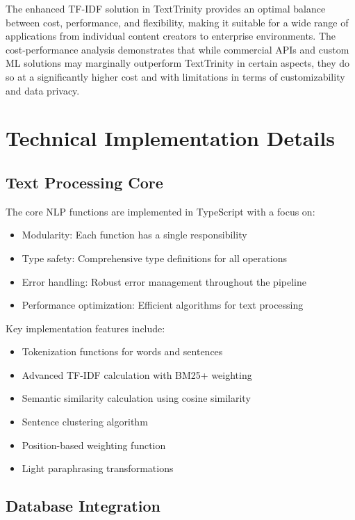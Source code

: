 \documentclass[12pt,a4paper]{article}
\begin{document}
The enhanced TF-IDF solution in TextTrinity provides an optimal balance between cost, performance, and flexibility, making it suitable for a wide range of applications from individual content creators to enterprise environments. The cost-performance analysis demonstrates that while commercial APIs and custom ML solutions may marginally outperform TextTrinity in certain aspects, they do so at a significantly higher cost and with limitations in terms of customizability and data privacy.

\section{Technical Implementation Details}

\subsection{Text Processing Core}

The core NLP functions are implemented in TypeScript with a focus on:

\begin{itemize}
    \item Modularity: Each function has a single responsibility
    \item Type safety: Comprehensive type definitions for all operations
    \item Error handling: Robust error management throughout the pipeline
    \item Performance optimization: Efficient algorithms for text processing
\end{itemize}

Key implementation features include:

\begin{itemize}
    \item Tokenization functions for words and sentences
    \item Advanced TF-IDF calculation with BM25+ weighting
    \item Semantic similarity calculation using cosine similarity
    \item Sentence clustering algorithm
    \item Position-based weighting function
    \item Light paraphrasing transformations
\end{itemize}

\subsection{Database Integration}
\end{document}
